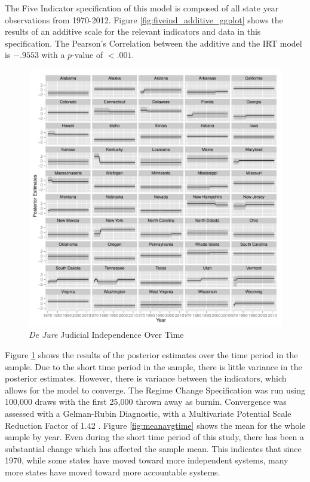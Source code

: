 \documentclass[12pt]{article}
\begin{document}
The Five Indicator specification of this model is composed of all state year observations from 1970-2012.  Figure \ref{fig:fiveind_additive_ggplot} shows the results of an additive scale for the relevant indicators and data in this specification.  The Pearson's Correlation between the additive and the IRT model is $-.9553$ with a $p$-value of $<.001$.

\begin{figure}
	\centering\caption{\textit{De Jure} Judicial Independence Over Time}
	\label{fig:fiveind_timeplot}
	\includegraphics[scale=.8]{graphics/fiveind/fiveind_timeplot}
\end{figure}

Figure \ref{fig:fiveind_timeplot} shows the results of the posterior estimates over the time period in the sample.  Due to the short time period in the sample, there is little variance in the posterior estimates.  However, there is variance between the indicators, which allows for the model to converge.  The Regime Change Specification was run using 100,000 draws with the first 25,000 thrown away as burnin.  Convergence was assessed with a Gelman-Rubin Diagnostic, with a Multivariate Potential Scale Reduction Factor of 1.42 \citep{Gelman1992}.  Figure \ref{fig:meanavgtime} shows the mean for the whole sample by year.  Even during the short time period of this study, there has been a substantial change which has affected the sample mean.  This indicates that since 1970, while some states have moved toward more independent systems, many more states have moved toward more accountable systems.
\end{document}
